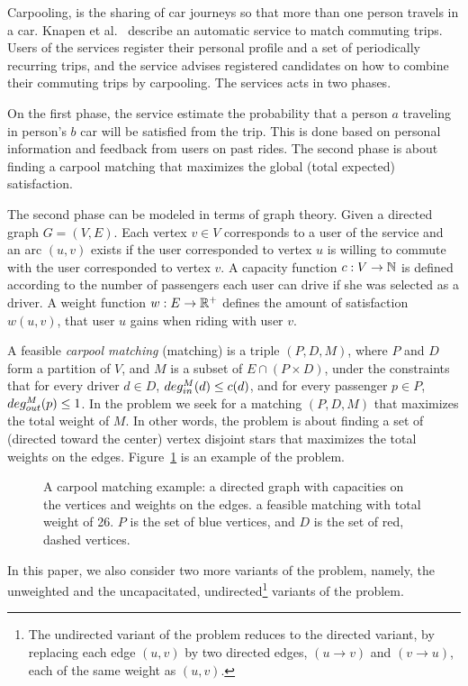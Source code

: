 Carpooling, is the sharing of car journeys so that more than one person travels
in a car.
Knapen et al.~\cite{knapen2013estimating} describe an automatic service
to match commuting trips.
Users of the services register their personal profile and a set of periodically
recurring trips, 
and the service advises registered candidates on how to combine their commuting
trips by carpooling.
The services acts in two phases. 

On the first phase, the service estimate the probability that a person $a$
traveling in person's $b$ car will be satisfied from the trip.
This is done based on personal information and feedback from users on past
rides.
The second phase is about finding a carpool matching
that maximizes the global (total expected) satisfaction.

The second phase can be modeled in terms of graph theory.
Given a directed graph $G = (V, E)$.
Each vertex $v \in V$ corresponds to a user of the service and an arc
$(u, v)$ exists if the user corresponded to vertex $u$ is willing to
commute with the user corresponded to vertex $v$.
A capacity function $ c: V \rightarrow \mathbb{N} $ is defined
according to the number of passengers each user can drive if she was
selected as a driver.
A weight function $w : E \rightarrow \mathbb{R^+} $ defines the amount of
satisfaction $w(u, v)$,
that user $u$ gains when riding with user $v$.

A feasible \emph{carpool matching} (matching) is a triple 
$(P, D, M)$, where $P$ and $D$ form a partition of $V$, 
and $M$ is a subset of $E \cap (P \times D)$,
under the constraints that for every driver $d \in D$, 
$deg^M_{in}(d) \leq c(d)$, 
and for every passenger $p \in P$, ${deg^M_{out}(p) \leq 1}$.
In the \textsc{\CARPOOL{}} problem we seek for a matching $(P, D, M)$ that maximizes the
total weight of $M$.
In other words, the \textsc{\CARPOOL{}} problem is about finding a set of 
(directed toward the center) vertex disjoint stars 
that maximizes the total weights on the edges.
Figure~\ref{fig:carpool} is an example of the \textsc{\CARPOOL{}} problem.
\begin{figure}
\centering

\caption[]{
\label{fig:carpool}
A carpool matching example: 
a directed graph with capacities on the vertices and weights on the edges. 
a feasible matching with total weight of 26.
$P$ is the set of blue vertices, and $D$ is the set of red, dashed vertices. 
}
\end{figure}  

In this paper, we also consider two more variants of the problem, namely, 
the unweighted and the uncapacitated, undirected\footnote{
The undirected variant of the problem reduces to the directed variant,
by replacing each edge $(u,v)$ by two directed edges,
$(u \rightarrow v)$ and $(v \rightarrow u)$,
each of the same weight as $(u,v)$.} variants of the problem. 
  

